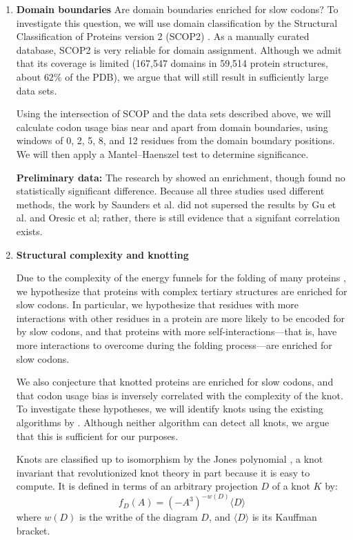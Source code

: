 \documentclass[11pt]{nih}
\begin{document}
\begin{enumerate}
\item \textbf{Domain boundaries}
Are domain boundaries enriched for slow codons?
To investigate this question, we will use domain classification by the Structural Classification of Proteins version 2 (SCOP2) \citep{Andreeva2013,scop}. As a manually curated database, SCOP2 is very reliable for domain assignment. Although we admit that its coverage is limited (167,547 domains in 59,514 protein structures, about $62\%$ of the PDB), we argue that will still result in sufficiently large data sets.

Using the intersection of SCOP and the data sets described above, we will calculate codon usage bias near and apart from domain boundaries, using windows of 0, 2, 5, 8, and 12 residues from the domain boundary positions. We will then apply a Mantel--Haenszel test to determine significance.

\textbf{Preliminary data:} The research by \citet{Gu2004,Oresic2003} showed an enrichment, though \citet{Saunders2010} found no statistically significant difference. Because all three studies used different methods, the work by Saunders et al. did not supersed the results by Gu et al. and Oresic et al; rather, there is still evidence that a signifant correlation exists.

\item \textbf{Structural complexity and knotting}

Due to the complexity of the energy funnels for the folding of many proteins \citep{bryngelson1995funnels,Onuchic2004}, we hypothesize that proteins with complex tertiary structures are enriched for slow codons. In particular, we hypothesize that residues with more interactions with other residues in a protein are more likely to be encoded for by slow codons, and that proteins with more self-interactions---that is, have more interactions to overcome during the folding process---are enriched for slow codons.

We also conjecture that knotted proteins are enriched for slow codons, and that codon usage bias is inversely correlated with the complexity of the knot. To investigate these hypotheses, we will identify knots using the existing algorithms by \citet{Lai2012,Virnau2006}. Although neither algorithm can detect all knots, we argue that this is sufficient for our purposes.

Knots are classified up to isomorphism by the Jones polynomial \cite{Jones2005}, a knot invariant that revolutionized knot theory in part because it is easy to compute. It is defined in terms of an arbitrary projection $D$ of a knot $K$ by:\\
\begin{equation}
f_D(A) = (-A^3)^{-w(D)}\langle D \rangle
\end{equation}
where $w(D)$ is the writhe of the diagram $D$, and $\langle D\rangle$ is its Kauffman bracket.


\end{enumerate}
\end{document}
